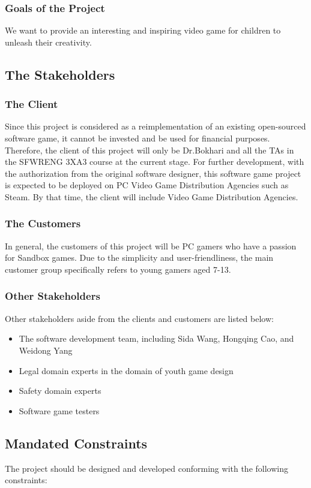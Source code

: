 \documentclass[12pt, titlepage]{article}
\begin{document}
\subsubsection{Goals of the Project}
We want to provide an interesting and inspiring video game for children to unleash their creativity.

\subsection{The Stakeholders}

\subsubsection{The Client}
Since this project is considered as a reimplementation of an existing open-sourced software game, it cannot be invested and be used for financial purposes. Therefore, the client of this project will only be Dr.Bokhari and all the TAs in the SFWRENG 3XA3 course at the current stage. For further development, with the authorization from the original software designer, this software game project is expected to be deployed on PC Video Game Distribution Agencies such as Steam. By that time, the client will include Video Game Distribution Agencies.
\subsubsection{The Customers}
In general, the customers of this project will be PC gamers who have a passion for Sandbox games. Due to the simplicity and user-friendliness, the main customer group specifically refers to young gamers aged 7-13. 
\subsubsection{Other Stakeholders}
Other stakeholders aside from the clients and customers are listed below:
\begin{itemize}
        \item The software development team, including Sida Wang, Hongqing Cao, and Weidong Yang
        \item Legal domain experts in the domain of youth game design
        \item Safety domain experts
        \item Software game testers
\end{itemize}
\subsection{Mandated Constraints}
The project should be designed and developed conforming with the following constraints:
\end{document}
